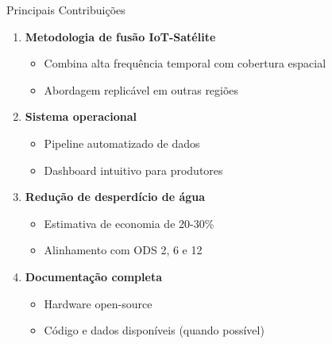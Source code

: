 \documentclass[aspectratio=169]{beamer}
\begin{document}
\begin{frame}{Principais Contribuições}
  \begin{enumerate}
    \item \textbf{Metodologia de fusão IoT-Satélite}
      \begin{itemize}
        \item Combina alta frequência temporal com cobertura espacial
        \item Abordagem replicável em outras regiões
      \end{itemize}
    
    \item \textbf{Sistema operacional}
      \begin{itemize}
        \item Pipeline automatizado de dados
        \item Dashboard intuitivo para produtores
      \end{itemize}
    
    \item \textbf{Redução de desperdício de água}
      \begin{itemize}
        \item Estimativa de economia de 20-30\%
        \item Alinhamento com ODS 2, 6 e 12
      \end{itemize}
    
    \item \textbf{Documentação completa}
      \begin{itemize}
        \item Hardware open-source
        \item Código e dados disponíveis (quando possível)
      \end{itemize}
  \end{enumerate}
\end{frame}
\end{document}
